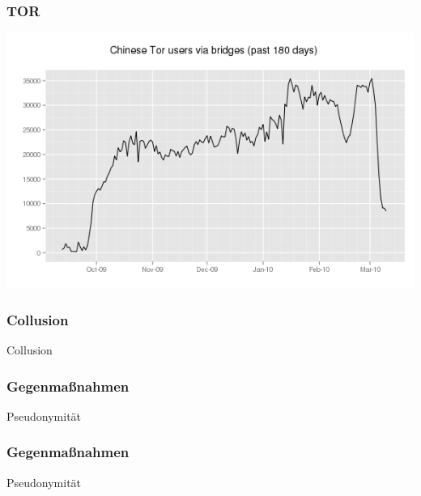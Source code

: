\documentclass[12pt]{beamer}
\begin{document}
\begin{frame}
    \frametitle{TOR}
    \includegraphics[height=0.7\textheight]{img/bridge2.png}
\end{frame}

\begin{frame}
    \frametitle{Collusion}
    \begin{center} \Large Collusion \end{center}
\end{frame}

\begin{frame}
    \frametitle{Gegenmaßnahmen}
    \begin{center} \Large Pseudonymität \end{center}
\end{frame}

\begin{frame}
    \frametitle{Gegenmaßnahmen}
    \begin{center} \Large Pseudonymität \end{center}
\end{frame}
\end{document}
